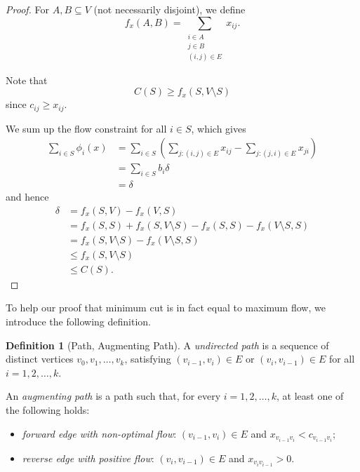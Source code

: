 \documentclass[11pt]{article}
\theoremstyle{definition}
\newtheorem{definition}[theorem]{Definition}
\theoremstyle{remark}
\newcommand{\pqty}[1]{\left(#1\right)}
\begin{document}
\begin{proof}
    For \(A, B \subseteq V\) (not necessarily disjoint), we define
    \[
        f_x \pqty{A, B} = \sum_{\substack{i \in A \\ j \in B \\ \pqty{i, j} \in E}} x_{ij}.
    \]

    Note that
    \[
        C\pqty{S} \geq f_x \pqty{S, V \setminus S}
    \]
    since \(c_{ij} \geq x_{ij}\).

    We sum up the flow constraint for all \(i \in S\), which gives
    \begin{align*}
        \sum_{i \in S} \phi_i \pqty{x} &= \sum_{i \in S} \pqty{\sum_{j: \pqty{i, j} \in E} x_{ij} - \sum_{j: \pqty{j, i} \in E} x_{ji}} \\
        &= \sum_{i \in S} b_i \delta \\
        &= \delta
    \end{align*}
    and hence
    \begin{align*}
        \delta &= f_x \pqty{S, V} - f_x \pqty{V, S} \\
        &= f_x \pqty{S, S} + f_x \pqty{S, V \setminus S} - f_x \pqty{S, S} - f_x \pqty{V \setminus S, S} \\
        &= f_x \pqty{S, V \setminus S} - f_x \pqty{V \setminus S, S} \\
        &\leq f_x \pqty{S, V \setminus S} \\
        &\leq C \pqty{S}.
    \end{align*}
\end{proof}

To help our proof that minimum cut is in fact equal to maximum flow, we introduce the following definition.

\begin{definition}[Path, Augmenting Path]\label{optim-unit-0081}
    A \emph{undirected path} is a sequence of distinct vertices \(v_0, v_1, \ldots, v_k\), satisfying \(\pqty{v_{i - 1}, v_i} \in E\) or \(\pqty{v_i, v_{i - 1}} \in E\) for all \(i = 1, 2, \ldots, k\).

    An \emph{augmenting path} is a path such that, for every \(i = 1, 2, \ldots, k\), at least one of the following holds:
    \begin{itemize}
        \item \emph{forward edge with non-optimal flow}: \(\pqty{v_{i - 1}, v_i} \in E\) and \(x_{v_{i - 1} v_i} < c_{v_{i - 1} v_i}\);
        \item \emph{reverse edge with positive flow}: \(\pqty{v_i, v_{i - 1}} \in E\) and \(x_{v_i v_{i - 1}} > 0\).
    \end{itemize}
\end{definition}
\end{document}
